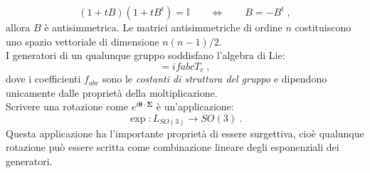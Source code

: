 \documentclass[10pt,a4paper]{report}
\theoremstyle{definition}
\numberwithin{equation}{section}
\begin{document}
$$
(1+tB)(1+tB^t)=\mathbb{I}\qquad \Longleftrightarrow \qquad B=-B^t\;,
$$
allora $B$ è antisimmetrica. Le matrici antisimmetriche di ordine $n$ costituiscono uno spazio vettoriale di dimensione $n(n-1)/2$. \\
I generatori di un qualunque gruppo soddisfano l'algebra di Lie:
\begin{equation}
[T_a,T_b]=if{abc}T_c\;,
\end{equation}
dove i coefficienti $f_{abc}$ sono le \textit{costanti di struttura del gruppo} e dipendono unicamente dalle proprietà della moltiplicazione. \\
Scrivere una rotazione come $e^{i\boldsymbol{\theta}\cdot \boldsymbol{\Sigma}}$ è un'applicazione:
\begin{equation}
\exp: L_{SO(3)} \longrightarrow SO(3)\;.
\end{equation}
Questa applicazione ha l'importante proprietà di essere surgettiva, cioè qualunque rotazione può essere scritta come combinazione lineare degli esponenziali dei generatori.
\end{document}
